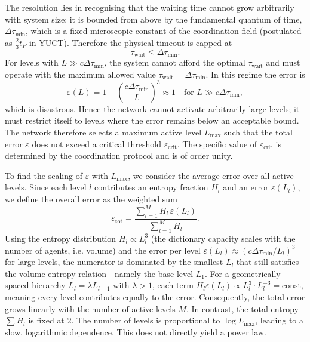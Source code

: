 \documentclass[12pt,a4paper]{article}
\begin{document}
	The resolution lies in recognising that the waiting time cannot grow arbitrarily with system size: it is bounded from above by the fundamental quantum of time, \(\Delta\tau_{\min}\), which is a fixed microscopic constant of the coordination field (postulated as \(\frac23 t_P\) in YUCT). Therefore the physical timeout is capped at
	\[
	\tau_{\mathrm{wait}} \le \Delta\tau_{\min}.
	\]
	For levels with \(L \gg c\Delta\tau_{\min}\), the system cannot afford the optimal \(\tau_{\mathrm{wait}}\) and must operate with the maximum allowed value \(\tau_{\mathrm{wait}} = \Delta\tau_{\min}\). In this regime the error is
	\[
	\varepsilon(L) = 1 - \left(\frac{c\Delta\tau_{\min}}{L}\right)^3 \approx 1 \quad\text{for } L \gg c\Delta\tau_{\min},
	\]
	which is disastrous. Hence the network cannot activate arbitrarily large levels; it must restrict itself to levels where the error remains below an acceptable bound. The network therefore selects a maximum active level \(L_{\max}\) such that the total error \(\varepsilon\) does not exceed a critical threshold \(\varepsilon_{\mathrm{crit}}\). The specific value of \(\varepsilon_{\mathrm{crit}}\) is determined by the coordination protocol and is of order unity.
	
	To find the scaling of \(\varepsilon\) with \(L_{\max}\), we consider the average error over all active levels. Since each level \(l\) contributes an entropy fraction \(H_l\) and an error \(\varepsilon(L_l)\), we define the overall error as the weighted sum
	\[
	\varepsilon_{\mathrm{tot}} = \frac{\sum_{l=1}^{M} H_l\, \varepsilon(L_l)}{\sum_{l=1}^{M} H_l}.
	\]
	Using the entropy distribution \(H_l \propto L_l^3\) (the dictionary capacity scales with the number of agents, i.e. volume) and the error per level \(\varepsilon(L_l) \approx (c\Delta\tau_{\min}/L_l)^3\) for large levels, the numerator is dominated by the smallest \(L_l\) that still satisfies the volume‑entropy relation—namely the base level \(L_1\). For a geometrically spaced hierarchy \(L_l = \lambda L_{l-1}\) with \(\lambda > 1\), each term \(H_l\varepsilon(L_l) \propto L_l^3 \cdot L_l^{-3} = \text{const}\), meaning every level contributes equally to the error. Consequently, the total error grows linearly with the number of active levels \(M\). In contrast, the total entropy \(\sum H_l\) is fixed at 2. The number of levels is proportional to \(\log L_{\max}\), leading to a slow, logarithmic dependence. This does not directly yield a power law.
	
\end{document}
